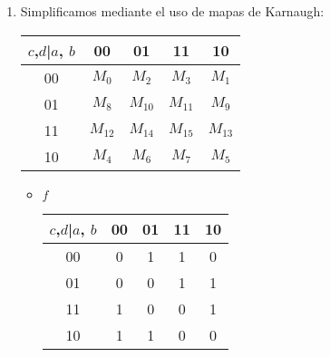 \documentclass[../../informe/src/main.tex]{subfiles}
\begin{document}
\begin{enumerate}
			
		\item Simplificamos mediante el uso de mapas de Karnaugh: \par

 			\begin{table}[H] %
				\centering
 				\begin{tabular}{||c c c c c||} 
 					\hline
					$c$,$d$|$a$, $b$ & 00 & 01 & 11 & 10\\ [0.5ex] 
 					\hline\hline
					00 & $M_{0}$ & $M_{2}$ & $M_{3}$ & $M_{1}$\\
					01 & $M_{8}$ & $M_{10}$ & $M_{11}$ & $M_{9}$\\
					11 & $M_{12}$ & $M_{14}$ & $M_{15}$ & $M_{13}$\\
					10 & $M_{4}$ & $M_{6}$ & $M_{7}$ & $M_{5}$\\[1ex] 
					\hline
				\end{tabular}
			\end{table}
			\begin{itemize}
				\item $f$
				\begin{table}[H] %
					\centering
 					\begin{tabular}{||c c c c c||} 
 						\hline
						$c$,$d$|$a$, $b$ & 00 & 01 & 11 & 10\\ [0.5ex] 
 						\hline\hline
						00 & 0 & 1 & 1 & 0 \\
						01 & 0 & 0 & 1 & 1 \\
						11 & 1 & 0 & 0 & 1 \\
						10 & 1 & 1 & 0 & 0 \\[1ex] 
						\hline
					\end{tabular}
				\end{table}
			\end{itemize}
	 \end{enumerate}
\end{document}

